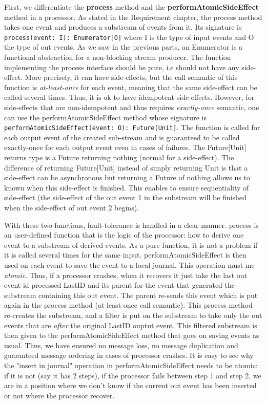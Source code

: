 First, we differentiate the \textbf{process} method and the \textbf{performAtomicSideEffect} method in a processor. As stated in the Requirement chapter, the process method 
takes one event and produces a substream of events from it. Its signature is \verb|process(event: I): Enumerator[O]| where I is the type of input events and O the type
of out events. As we saw in the previous parts, an Enumerator is a functional abstraction for a non-blocking stream producer. The function implementing the process interface
should be pure, i.e should not have any side-effect. More precisely, it can have side-effects, but the call semantic of this function is \textit{at-least-once} for each 
event, meaning that the same side-effect can be called several times. Thus, it is ok to have idempotent side-effects. However, for side-effects that are non-idempotent and
thus requires \textit{exactly-once} semantic, one can use the performAtomicSideEffect method whose signature is \verb|performAtomicSideEffect(event: O): Future[Unit]|.
The function is called for each output event of the created sub-stream and is guaranteed to be called exactly-once for each output event even in cases of failures. The
Future[Unit] returns type is a Future returning nothing (normal for a side-effect). The difference of returning Future[Unit] instead of simply returning Unit is that a side-effect
can be asynchronous but returning a Future of nothing allows us to known when this side-effect is finished. This enables to ensure sequentiality of side-effect (the side-effect
of the out event 1 in the substream will be finished when the side-effect of out event 2 begins).

With these two functions, fault-tolerance is handled in a clear manner. process is an user-defined function that is the logic of the processor: how to derive one event to a substream of derived events. As a pure function, it is not a problem if it is called several times for the same input. performAtomicSideEffect is then used on each event to
save the event to a local journal. This operation must me \textit{atomic}. Thus, if a processor crashes, when it recovers it just take the last out event id processed LastID and its parent for the event that generated the substream containing this out event. The parent re-sends this event which is put again in the process method (at-least-once call semantic).
This process method re-creates the substream, and a filter is put on the substream to take only the out events that are \textit{after} the original LastID ouptut event. This
filtered substream is then given to the performAtomicSideEffect method that goes on saving events as usual.
Thus, we have ensured no message loss, no message duplication and guaranteed message ordering in cases of processor crashes. It is easy to see why the "insert in journal" operation in performAtomicSideEffect needs to be atomic: if it is not (say it has 2 steps), if the processor fails between step 1 and step 2, we are in a position where
we don't know if the current out event has been inserted or not where the processor recover. 

